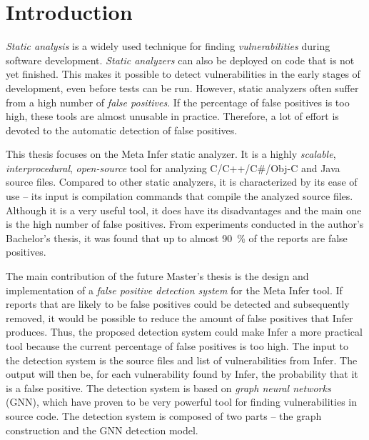 \chapter{Introduction}
\textit{Static analysis} is a widely used technique for finding \textit{vulnerabilities} during software development. \textit{Static analyzers} can also be deployed on code that is not yet finished. This makes it possible to detect vulnerabilities in the early stages of development, even before tests can be run. However, static analyzers often suffer from a high number of \textit{false positives}. If the percentage of false positives is too high, these tools are almost unusable in practice. Therefore, a lot of effort is devoted to the automatic detection of false positives.

This thesis focuses on the Meta Infer static analyzer. It is a highly \textit{scalable}, \textit{interprocedural}, \textit{open-source} tool for analyzing C/C++/C\#/Obj-C and Java source files. Compared to other static analyzers, it is characterized by its ease of use -- its input is compilation commands that compile the analyzed source files. Although it is a very useful tool, it does have its disadvantages and the main one is the high number of false positives. From experiments conducted in the author's Bachelor's thesis, it was found that up to almost 90~\% of the reports are false positives.

The main contribution of the future Master's thesis is the design and implementation of a \textit{false positive detection system} for the Meta Infer tool. If reports that are likely to be false positives could be detected and subsequently removed, it would be possible to reduce the amount of false positives that Infer produces. Thus, the proposed detection system could make Infer a more practical tool because the current percentage of false positives is too high. The input to the detection system is the source files and list of vulnerabilities from Infer. The output will then be, for each vulnerability found by Infer, the probability that it is a false positive. The detection system is based on \textit{graph neural networks} (GNN), which have proven to be very powerful tool for finding vulnerabilities in source code. The detection system is composed of two parts -- the graph construction and the GNN detection model. 

